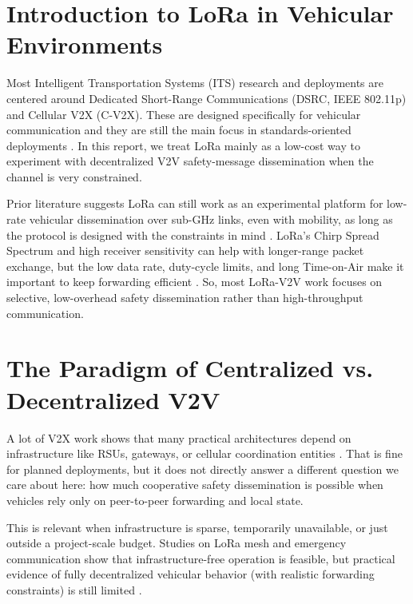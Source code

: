 \section{Introduction to LoRa in Vehicular Environments}

Most Intelligent Transportation Systems (ITS) research and deployments are centered around Dedicated Short-Range
Communications (DSRC, IEEE 802.11p) and Cellular V2X (C-V2X). These are designed specifically for vehicular
communication and they are still the main focus in standards-oriented deployments \cite{secure_iov,lorawan_v2roadside}.
In this report, we treat LoRa mainly as a low-cost way to experiment with decentralized V2V safety-message
dissemination when the channel is very constrained.

Prior literature suggests LoRa can still work as an experimental platform for low-rate vehicular dissemination
over sub-GHz links, even with mobility, as long as the protocol is designed with the constraints in mind
\cite{exp_study_lora_vehicle,lora_arch_v2x_move,urban_vanets_2023}. LoRa's Chirp Spread Spectrum and high
receiver sensitivity can help with longer-range packet exchange, but the low data rate, duty-cycle limits, and
long Time-on-Air make it important to keep forwarding efficient \cite{lora_mesh_iot,routing_mesh_2020}.
So, most LoRa-V2V work focuses on selective, low-overhead safety dissemination rather than high-throughput
communication.

\section{The Paradigm of Centralized vs. Decentralized V2V}

A lot of V2X work shows that many practical architectures depend on infrastructure
like RSUs, gateways, or cellular coordination entities \cite{secure_iov,lorawan_v2roadside}. That is fine for
planned deployments, but it does not directly answer a different question we care about here: how much
cooperative safety dissemination is possible when vehicles rely only on peer-to-peer forwarding and local state.

This is relevant when infrastructure is sparse, temporarily unavailable, or just outside a project-scale budget.
Studies on LoRa mesh and emergency communication show that infrastructure-free operation is feasible, but
practical evidence of fully decentralized vehicular behavior (with realistic forwarding constraints) is still
limited \cite{lora_mesh_emergency,lora_mesh_iot,routing_mesh_2020}.


